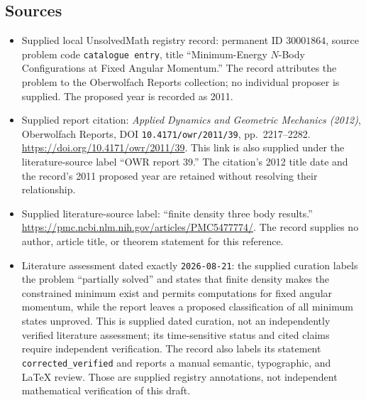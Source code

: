 \documentclass[11pt]{article}
\begin{document}
\subsection{Sources}
\begin{itemize}
\item Supplied local UnsolvedMath registry record: permanent ID \(30001864\), source problem code \texttt{catalogue entry}, title ``Minimum-Energy \(N\)-Body Configurations at Fixed Angular Momentum.'' The record attributes the problem to the Oberwolfach Reports collection; no individual proposer is supplied. The proposed year is recorded as 2011.
\item Supplied report citation: \emph{Applied Dynamics and Geometric Mechanics (2012)}, Oberwolfach Reports, DOI \texttt{10.4171/owr/2011/39}, pp.\ 2217--2282. \url{https://doi.org/10.4171/owr/2011/39}. This link is also supplied under the literature-source label ``OWR report 39.'' The citation's 2012 title date and the record's 2011 proposed year are retained without resolving their relationship.
\item Supplied literature-source label: ``finite density three body results.'' \url{https://pmc.ncbi.nlm.nih.gov/articles/PMC5477774/}. The record supplies no author, article title, or theorem statement for this reference.
\item Literature assessment dated exactly \texttt{2026-08-21}: the supplied curation labels the problem ``partially solved'' and states that finite density makes the constrained minimum exist and permits computations for fixed angular momentum, while the report leaves a proposed classification of all minimum states unproved. This is supplied dated curation, not an independently verified literature assessment; its time-sensitive status and cited claims require independent verification. The record also labels its statement \texttt{corrected\_verified} and reports a manual semantic, typographic, and LaTeX review. Those are supplied registry annotations, not independent mathematical verification of this draft.
\end{itemize}
\end{document}
